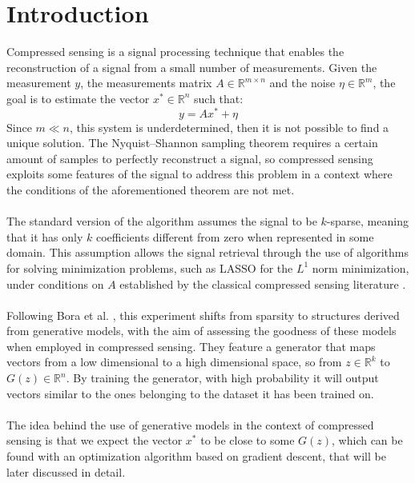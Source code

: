 \section{Introduction}
\vspace{1cm}
Compressed sensing is a signal processing technique that enables the reconstruction of a signal from a small number of measurements. Given the measurement $y$, the measurements matrix $A\in\mathbb{R}^{m\times n}$ and the noise $\eta\in\mathbb{R}^m$, the goal is to estimate the vector $x^*\in\mathbb{R}^n$ such that:
\begin{equation}
    y=Ax^*+\eta
\end{equation}
Since $m\ll n$, this system is underdetermined, then it is not possible to find a unique solution. The Nyquist–Shannon sampling theorem requires a certain amount of samples to perfectly reconstruct a signal, so compressed sensing exploits some features of the signal to address this problem in a context where the conditions of the aforementioned theorem are not met.
\\\\
The standard version of the algorithm assumes the signal to be $k$-sparse, meaning that it has only $k$ coefficients different from zero when represented in some domain. This assumption allows the signal retrieval through the use of algorithms for solving minimization problems, such as LASSO \cite{tibshirani1996} for the $L^1$ norm minimization, under conditions on $A$ established by the classical compressed sensing literature \cite{candes2006,donoho2006}.
\\\\
Following Bora et al. \cite{bora2017}, this experiment shifts from sparsity to structures derived from generative models, with the aim of assessing the goodness of these models when employed in compressed sensing. They feature a generator that maps vectors from  a low dimensional to a high dimensional space, so from $z\in\mathbb{R}^k$ to $G(z)\in\mathbb{R}^n$. By training the generator, with high probability it will output vectors similar to the ones belonging to the dataset it has been trained on.
\\\\
The idea behind the use of generative models in the context of compressed sensing is that we expect the vector $x^*$ to be close to some $G(z)$, which can be found with an optimization algorithm based on gradient descent, that will be later discussed in detail.